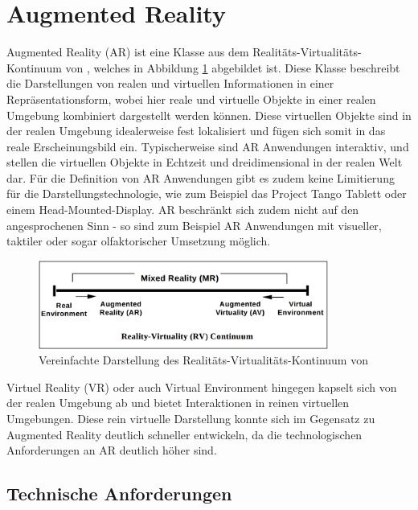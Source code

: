 
\section{Augmented Reality}

Augmented Reality (AR) ist eine Klasse aus dem Realitäts-Virtualitäts-Kontinuum von \cite{milgram1995augmented}, welches in Abbildung \ref{fig:virtual-continuum} abgebildet ist. Diese Klasse beschreibt die Darstellungen von realen und virtuellen Informationen in einer Repräsentationsform, wobei hier reale und virtuelle Objekte in einer realen Umgebung kombiniert dargestellt werden können. Diese virtuellen Objekte sind in der realen Umgebung idealerweise fest lokalisiert und fügen sich somit in das reale Erscheinungsbild ein. Typischerweise sind AR Anwendungen interaktiv, und stellen die virtuellen Objekte in Echtzeit und dreidimensional in der realen Welt dar. Für die Definition von AR Anwendungen gibt es zudem keine Limitierung für die Darstellungstechnologie, wie zum Beispiel das Project Tango Tablett oder einem Head-Mounted-Display. AR beschränkt sich zudem nicht auf den angesprochenen Sinn - so sind zum Beispiel AR Anwendungen mit visueller, taktiler oder sogar olfaktorischer Umsetzung möglich.

\begin{figure}
  \centering
	\includegraphics[width=0.85\textwidth]{content/images/theory/virtual-continuum.png} 
  \caption{Vereinfachte Darstellung des Realitäts-Virtualitäts-Kontinuum von \citet*{milgram1995augmented}}
  \label{fig:virtual-continuum}
\end{figure}


Virtuel Reality (VR) oder auch Virtual Environment hingegen kapselt sich von der realen Umgebung ab und bietet Interaktionen in reinen virtuellen Umgebungen. Diese rein virtuelle Darstellung konnte sich im Gegensatz zu Augmented Reality deutlich schneller entwickeln, da die technologischen Anforderungen an AR deutlich höher sind. \citep{van2010survey}

\subsection{Technische Anforderungen}

